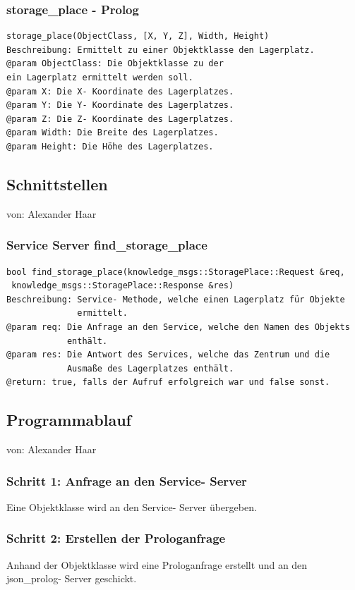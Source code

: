 \documentclass{suturo}
\makeatletter
\newcommand{\chapterauthor}[1]{%
  {\parindent0pt\vspace*{-27pt}%
  \linespread{0}\small\begin{flushright}von: #1\end{flushright}%
  \par\nobreak\vspace*{0pt}}
  \@afterheading%
}
\makeatother
\begin{document}
\subsubsection{storage\_place - Prolog}
\begin{verbatim}
storage_place(ObjectClass, [X, Y, Z], Width, Height)
Beschreibung: Ermittelt zu einer Objektklasse den Lagerplatz.
@param ObjectClass: Die Objektklasse zu der
ein Lagerplatz ermittelt werden soll.
@param X: Die X- Koordinate des Lagerplatzes.
@param Y: Die Y- Koordinate des Lagerplatzes.
@param Z: Die Z- Koordinate des Lagerplatzes.
@param Width: Die Breite des Lagerplatzes.
@param Height: Die Höhe des Lagerplatzes.
\end{verbatim}

\subsection{Schnittstellen}
\chapterauthor{Alexander Haar}

\subsubsection{Service Server find\_storage\_place}
\begin{verbatim}
bool find_storage_place(knowledge_msgs::StoragePlace::Request &req,
 knowledge_msgs::StoragePlace::Response &res)
Beschreibung: Service- Methode, welche einen Lagerplatz für Objekte 
              ermittelt.
@param req: Die Anfrage an den Service, welche den Namen des Objekts 
            enthält.  
@param res: Die Antwort des Services, welche das Zentrum und die 
            Ausmaße des Lagerplatzes enthält.
@return: true, falls der Aufruf erfolgreich war und false sonst.
\end{verbatim}\label{func:findcluster}

\subsection{Programmablauf}
\chapterauthor{Alexander Haar}
\subsubsection{Schritt 1: Anfrage an den Service- Server}
Eine Objektklasse wird an den Service- Server übergeben.
\subsubsection{Schritt 2: Erstellen der Prologanfrage}
Anhand der Objektklasse wird eine Prologanfrage erstellt und an den json\_prolog- Server geschickt.
\end{document}
